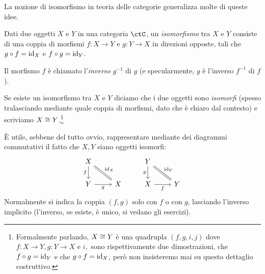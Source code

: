 La nozione di isomorfismo in teoria delle categorie generalizza molte di queste idee.
\begin{definition}[Isomorfismo]\label{def_isomorfismo}
 Dati due oggetti $X$ e $Y$ in una categoria $\ctC$, un \emph{isomorfismo} tra $X$ e $Y$ consiste di una coppia di morfismi $f:X\to Y$ e $g:Y\to X$ in direzioni opposte, tali che $g\circ f=\mathrm{id}_X$ e $f\circ g=\mathrm{id}_Y$.

 Il morfismo $f$ è chiamato l'\emph{inverso} $g^{-1}$ di $g$ (e specularmente, $g$ è l'inverso $f^{-1}$ di $f$).

 Se esiste un isomorfismo tra $X$ e $Y$ diciamo che i due oggetti sono \emph{isomorfi} (spesso tralasciando mediante quale coppia di morfismi, dato che è chiaro dal contesto) e scriviamo $X\cong Y$.\footnote{Formalmente parlando, $X\cong Y$ è una quadrupla $(f,g, i,j)$ dove $f : X\to Y, g: Y\to X$ e $i,$ sono rispettivamente due dimostrazioni, che $f\circ g= \mathrm{id}_Y$ e che $g\circ f=\mathrm{id}_X$, però non insisteremo mai su questo dettaglio costruttivo.}
\end{definition}
\`E utile, sebbene del tutto ovvio, rappresentare mediante dei diagrammi commutativi il fatto che $X,Y$ siano oggetti isomorfi: %
\[
\begin{tikzcd}
 X\ar[d, "f"'] \ar[dr, equal, "\id_X"]& & Y \ar[dr, equal, "\id_Y"]\ar[d,"g"']\\
 Y \ar[r, "g"']& X & X \ar[r, "f"']& Y
\end{tikzcd}
\]
Normalmente si indica la coppia $(f,g)$ solo con $f$ o con $g$, lasciando l'inverso implicito (l'inverso, se esiste, è unico, si vedano gli esercizi).
